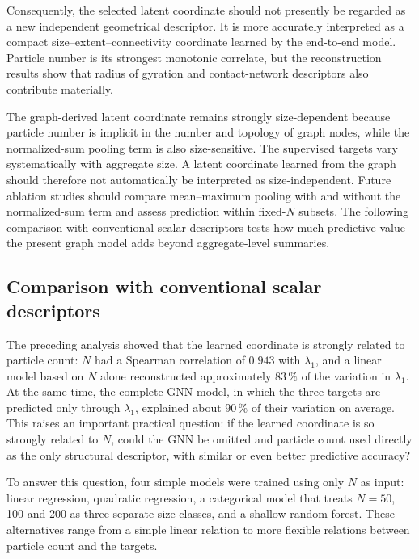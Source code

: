 \documentclass[12pt,a4paper]{article}
\begin{document}
Consequently, the selected latent coordinate should not presently be regarded
as a new independent geometrical descriptor. It is more accurately interpreted
as a compact size--extent--connectivity coordinate learned by the end-to-end
model. Particle number is its strongest monotonic correlate, but the
reconstruction results show that radius of gyration and contact-network
descriptors also contribute materially.

The graph-derived latent coordinate remains strongly size-dependent because
particle number is implicit in the number and topology of graph nodes, while
the normalized-sum pooling term is also size-sensitive. The supervised targets
vary systematically with aggregate size. A latent coordinate learned from the
graph should therefore not automatically be interpreted as size-independent.
Future ablation studies should compare mean--maximum pooling with and without
the normalized-sum term and assess prediction within fixed-$N$ subsets.
The following comparison with conventional scalar descriptors tests how much
predictive value the present graph model adds beyond aggregate-level summaries.

\subsection{Comparison with conventional scalar descriptors}
\label{sec:particle_count_baseline}

The preceding analysis showed that the learned coordinate is strongly related
to particle count: $N$ had a Spearman correlation of $0.943$ with $\lambda_1$,
and a linear model based on $N$ alone reconstructed approximately $83\,\%$ of
the variation in $\lambda_1$. At the same time, the complete GNN model, in which
the three targets are predicted only through $\lambda_1$, explained about
$90\,\%$ of their variation on average. This raises an important practical
question: if the learned coordinate is so strongly related to $N$, could the
GNN be omitted and particle count used directly as the only structural
descriptor, with similar or even better predictive accuracy?

To answer this question, four simple models were trained using only $N$ as
input: linear regression, quadratic regression, a categorical model that
treats $N=50$, 100 and 200 as three separate size classes, and a shallow random
forest. These alternatives range from a simple linear relation to more flexible
relations between particle count and the targets.
\end{document}
